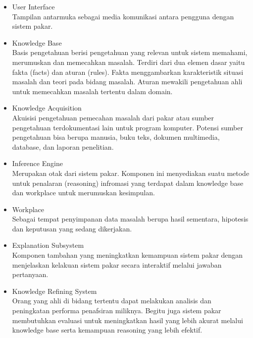 \begin{itemize}
	\item User Interface\\
	Tampilan antarmuka sebagai media komunikasi antara pengguna dengan sistem pakar.
	\item Knowledge Base\\
	Basis pengetahuan berisi pengetahuan yang relevan untuk sistem memahami, merumuskan dan memecahkan masalah. Terdiri dari dua elemen dasar yaitu fakta (facts) dan aturan (rules). Fakta menggambarkan karakteristik situasi masalah dan teori pada bidang masalah. Aturan mewakili pengetahuan ahli untuk memecahkan masalah tertentu dalam domain.
	\item Knowledge Acquisition\\
	Akuisisi pengetahuan pemecahan masalah dari pakar atau sumber pengetahuan terdokumentasi lain untuk program komputer. Potensi sumber pengetahuan bisa berupa manusia, buku teks, dokumen multimedia, database, dan laporan penelitian.
	\item Inference Engine \\
	Merupakan otak dari sistem pakar. Komponen ini menyediakan suatu metode untuk penalaran (reasoning) infromasi yang terdapat dalam knowledge base dan workplace untuk merumuskan kesimpulan.
	\item 	Workplace \\
	Sebagai tempat penyimpanan data masalah berupa hasil sementara, hipotesis dan keputusan yang sedang dikerjakan. 
	\item Explanation Subsystem \\
	Komponen tambahan yang meningkatkan kemampuan sistem pakar dengan menjelaskan kelakuan sistem pakar secara interaktif melalui jawaban pertanyaan.
	\item Knowledge Refining System \\
	Orang yang ahli di bidang tertentu dapat melakukan analisis dan peningkatan performa penafsiran miliknya. Begitu juga sistem pakar membutuhkan evaluasi untuk meningkatkan hasil yang lebih akurat melalui knowledge base serta kemampuan reasoning yang lebih efektif. 	
\end{itemize}


